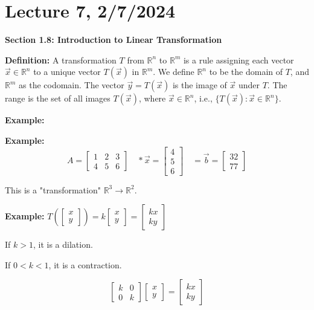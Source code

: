 \documentclass{article}
\begin{document}
\section{Lecture 7, 2/7/2024}

\textbf{Section 1.8: Introduction to Linear Transformation}

\textbf{Definition:} A transformation \(T\) from \(\mathbb{R}^n\) to \(\mathbb{R}^m\) is a rule assigning each vector \(\vec{x} \in \mathbb{R}^n\) to a unique vector \(T(\vec{x})\) in \(\mathbb{R}^m\). We define \(\mathbb{R}^n\) to be the domain of \(T\), and \(\mathbb{R}^m\) as the codomain. The vector \(\vec{y} = T(\vec{x})\) is the image of \(\vec{x}\) under \(T\). The range is the set of all images \(T(\vec{x})\), where \(\vec{x} \in \mathbb{R}^n\), i.e., \(\{T(\vec{x}): \vec{x} \in \mathbb{R}^n\}\).

\textbf{Example:}

\textbf{Example:}
\[ A = \begin{bmatrix} 1 & 2 & 3 \\ 4 & 5 & 6 \end{bmatrix} \quad * \vec{x} = \begin{bmatrix} 4 \\ 5 \\ 6 \end{bmatrix} \quad = \vec{b} = \begin{bmatrix} 32 \\ 77 \end{bmatrix} \]


This is a "transformation" \(\mathbb{R}^3 \rightarrow \mathbb{R}^2\).
\medskip

\textbf{Example:} \(T\left( \begin{bmatrix} x \\ y \end{bmatrix} \right) = k \begin{bmatrix} x \\ y \end{bmatrix} = \begin{bmatrix} kx \\ ky \end{bmatrix}\)

If \(k > 1\), it is a dilation.

If \(0 < k < 1\), it is a contraction.

\[
\begin{bmatrix}
    k & 0 \\
    0 & k
\end{bmatrix} \begin{bmatrix} x \\ y \end{bmatrix} = \begin{bmatrix} kx \\ ky \end{bmatrix}
\]
\end{document}
